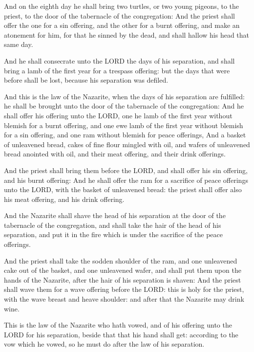 \Verse And on the eighth day he shall bring two turtles, or two young
pigeons, to the priest, to the door of the tabernacle of the
congregation: \Verse And the priest shall offer the one for a sin
offering, and the other for a burnt offering, and make an atonement
for him, for that he sinned by the dead, and shall hallow his head
that same day.

\Verse And he shall consecrate unto the LORD the days of his separation,
and shall bring a lamb of the first year for a trespass offering: but
the days that were before shall be lost, because his separation was
defiled.

\Verse And this is the law of the Nazarite, when the days of his
separation are fulfilled: he shall be brought unto the door of the
tabernacle of the congregation: \Verse And he shall offer his offering
unto the LORD, one he lamb of the first year without blemish for a
burnt offering, and one ewe lamb of the first year without blemish for
a sin offering, and one ram without blemish for peace offerings, \Verse
And a basket of unleavened bread, cakes of fine flour mingled with
oil, and wafers of unleavened bread anointed with oil, and their meat
offering, and their drink offerings.

\Verse And the priest shall bring them before the LORD, and shall offer
his sin offering, and his burnt offering: \Verse And he shall offer the
ram for a sacrifice of peace offerings unto the LORD, with the basket
of unleavened bread: the priest shall offer also his meat offering,
and his drink offering.

\Verse And the Nazarite shall shave the head of his separation at the
door of the tabernacle of the congregation, and shall take the hair of
the head of his separation, and put it in the fire which is under the
sacrifice of the peace offerings.

\Verse And the priest shall take the sodden shoulder of the ram, and one
unleavened cake out of the basket, and one unleavened wafer, and shall
put them upon the hands of the Nazarite, after the hair of his
separation is shaven: \Verse And the priest shall wave them for a wave
offering before the LORD: this is holy for the priest, with the wave
breast and heave shoulder: and after that the Nazarite may drink wine.

\Verse This is the law of the Nazarite who hath vowed, and of his
offering unto the LORD for his separation, beside that that his hand
shall get: according to the vow which he vowed, so he must do after
the law of his separation.

